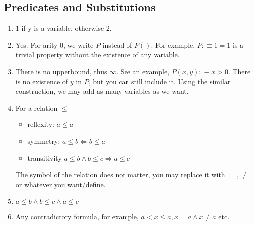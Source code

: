 \documentclass[12pt]{article}
\begin{document}
\subsection*{Predicates and Substitutions}
\begin{enumerate}
    \item 1 if y is a variable, otherwise 2.
    \item Yes. For arity 0, we write $P$ instead of $P()$. 
    For example, $P :\equiv 1 = 1$ is a trivial property without the existence of any variable.
    \item There is no upperbound, thus $\infty$. See an example, $P(x, y) :\equiv x > 0$. 
    There is no existence of $y$ in $P$, but you can still include it. Using the similar 
    construction, we may add as many variables as we want.
    \item For a relation $\leq$
    \begin{itemize}
        \item reflexity: $a \leq a$
        \item symmetry: $a \leq b \iff b \leq a$
        \item transitivity $a \leq b \land b \leq c \Longrightarrow a \leq c$
    \end{itemize}
    The symbol of the relation does not matter, you may replace it with $=, \not=$ or whatever you want/define.
    \item $a \leq b \land b \leq c \land a \leq c$
    \item Any contradictory formula, for example, $a < x \leq a, x = a \land x \not= a$ etc.
\end{enumerate}
\end{document}
